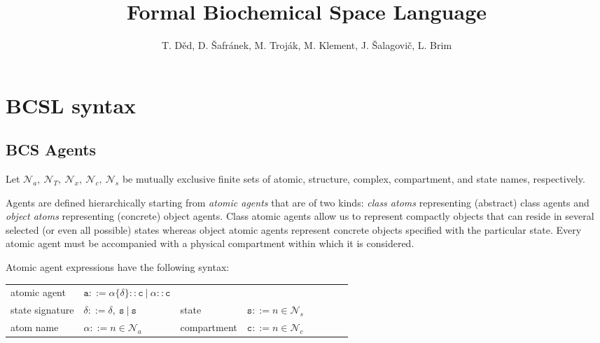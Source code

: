 \documentclass{entcs}
\renewcommand{\~}[0]{\texttildelow}
\newcommand{\choice}{|}
\begin{document}
\begin{frontmatter}
\title{Formal Biochemical Space Language}

\author{\normalsize
T. D\v{e}d, D. \v{S}afr\'anek, M. Troj\'ak, M. Klement, J. \v{S}alagovi\v{c}, L. Brim}
\address{Faculty of Informatics, Masaryk University\\
Brno, Czech Republic
}

\end{frontmatter}

\section{BCSL syntax}

\subsection{BCS Agents}

Let $\mathcal{N}_{a},~\mathcal{N}_{T},~\mathcal{N}_{x},~\mathcal{N}_{c},~\mathcal{N}_{s}$ be mutually exclusive finite sets of atomic, structure, complex, compartment, and state names, respectively. 

Agents are defined hierarchically starting from \emph{atomic agents} that are of two kinds: \emph{class atoms} representing (abstract) class agents and \emph{object atoms} representing (concrete) object agents. Class atomic agents allow us to represent compactly objects that can reside in several selected (or even all possible) states whereas object atomic agents represent concrete objects specified with the particular state. Every atomic agent must be accompanied with a physical compartment within which it is considered.

Atomic agent expressions have the following syntax:

\begin{center}
{\small
\hspace*{-1cm}\begin{tabular}{ ll ll ll ll }
 atomic agent & $\mathtt{a} ::= \alpha\{\delta\}::\mathtt{c}~\choice~\alpha::\mathtt{c}$  & \\
 state signature & $\delta ::= \delta,~\mathtt{s}~\choice~\mathtt{s}$ & state & $\mathtt{s} ::= n \in \mathcal{N}_{s}$\\
 atom name & $\alpha ::= n \in \mathcal{N}_{a}$ & compartment & $\mathtt{c} ::= n \in \mathcal{N}_{c}$\\
\end{tabular}
}
\end{center}
\end{document}
